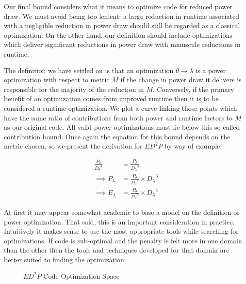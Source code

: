 Our final bound considers what it means to optimize code for reduced power draw. We must avoid being too lenient; a large reduction in runtime associated with a negligible reduction in power draw should still be regarded as a classical optimization. On the other hand, our definition should include optimizations which deliver significant reductions in power draw with minuscule reductions in runtime. 

The definition we have settled on is that an optimization $\theta \to \lambda$ is a power optimization with respect to metric $M$ if the change in power draw it delivers is responsible for the majority of the reduction in $M$. Conversely, if the primary benefit of an optimization comes from improved runtime then it is to be considered a runtime optimization. We plot a curve linking those points which have the same ratio of contributions from both power and runtime factors to $M$ as our original code. All valid power optimizations must lie below this so-called contribution bound. Once again the equation for this bound depends on the metric chosen, so we present the derivation for $ED^{2}P$ by way of example:

\begin{align}
\frac{P_{\theta}}{{D_{\theta}}^3} &= \frac{P_{\lambda}}{{D_\lambda}^3}\\ 
\implies P_{\lambda} &= \frac{P_{\theta}}{{D_{\theta}}^3} \times {D_{\lambda}}^3 \nonumber \\
\implies E_{\lambda} &= \frac{P_{\theta}}{{D_{\theta}}^3} \times {D_{\lambda}}^4
\end{align}


At first it may appear somewhat academic to base a model on the definition of power optimization. That said, this is an important consideration in practice. Intuitively it makes sense to use the most appropriate tools while searching for optimizations. If code is sub-optimal and the penalty is felt more in one domain than the other then the tools and techniques developed for that domain are better suited to finding the optimization.


\begin{figure}

\caption{$ED^2P$ Code Optimization Space}\label{fig:modeldraw}
\end{figure}



